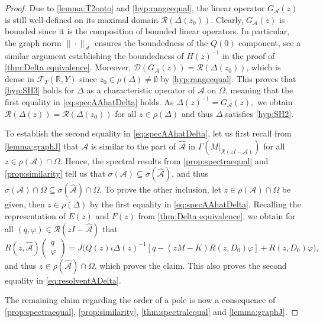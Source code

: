 \documentclass[english]{myarticle}
\begin{document}
\begin{sloppypar}
\begin{proof}
Due to \cref{lemma:T2onto} and \ref{hyp:rangeequal}, the linear operator $G_\mathcal{A}(z)$ is still well-defined on its maximal domain $\mathcal{R}(\Delta(z_0))$. Clearly, $G_{\mathcal{A}}(z)$ is bounded since it is the composition of bounded linear operators. In particular, the graph norm $\|\cdot\|_{\overline{\mathcal{A}}}$ ensures the boundedness of the $Q(0)$ component, see a similar argument establishing the boundedness of $H(z)^{-1}$ in the proof of \cref{thm:Delta equivalence}. Moreover, $\mathcal{D}(G_\mathcal{A}(z)) = \mathcal{R}(\Delta(z_0))$, which is dense in $\mathcal{F}_T(\mathbb{R},Y)$ since $z_0 \in \rho(\Delta) \neq \emptyset$ by \ref{hyp:rangeequal}. This proves that \ref{hyp:SH3} holds for $\Delta$ as a characteristic operator of $\mathcal{A}$ on $\Omega$, meaning that the first equality in \eqref{eq:specAAhatDelta} holds. As $\Delta(z)^{-1} = G_\mathcal{A}(z),$ we obtain $\mathcal{R}(\Delta(z)) = \mathcal{R}(\Delta(z_0))$ for all $z \in \rho(\Delta)$ and thus $\Delta$ satisfies \ref{hyp:SH2}.

To establish the second equality in \eqref{eq:specAAhatDelta}, let us first recall from \cref{lemma:graphJ} that $\mathcal{A}$ is similar to the part of $\hat{\mathcal{A}}$ in $\Gamma(M|_{\mathcal{R}(zI-\mathcal{A})})$ for all $z \in \rho(\mathcal{A}) \cap \Omega$. Hence, the spectral results from \cref{prop:spectraequal} and \cref{prop:similarity} tell us that $\sigma(\mathcal{A}) \subseteq \sigma(\hat{\mathcal{A}})$, and thus $\sigma(\mathcal{A}) \cap \Omega \subseteq \sigma(\hat{\mathcal{A}}) \cap \Omega$. To prove the other inclusion, let $z \in \rho(\mathcal{A}) \cap \Omega$ be given, then $z \in \rho(\Delta)$ by the first equality in \eqref{eq:specAAhatDelta}. Recalling the representation of $E(z)$ and $F(z)$ from \cref{thm:Delta equivalence}, we obtain for all $(q,\varphi) \in \mathcal{R}(zI-\hat{\mathcal{A}})$ that
\begin{equation*}
    R(z,\hat{\mathcal{A}}) \begin{pmatrix}
        q \\
        \varphi
    \end{pmatrix} = J \big(Q(z)\iota \Delta(z)^{-1}[q - (zM-K)R(z,D_0)\varphi] + R(z,D_0)\varphi \big),
\end{equation*}
and thus $z \in \rho(\hat{\mathcal{A}}) \cap \Omega$, which proves the claim. This also proves the second equality in \eqref{eq:resolventADelta}.

The remaining claim regarding the order of a pole is now a consequence of \cref{prop:spectraequal}, \cref{prop:similarity}, \cref{thm:spectralequal} and \cref{lemma:graphJ}.
\end{proof}


\end{sloppypar}
\end{document}
